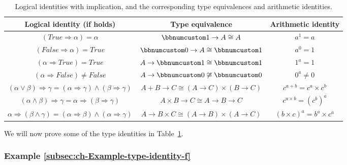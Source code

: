 \begin{table}
\begin{centering}
\begin{tabular}{|c|c|c|}
\hline 
\textbf{\small{}Logical identity (if holds)} & \textbf{\small{}Type equivalence} & \textbf{\small{}Arithmetic identity}\tabularnewline
\hline 
\hline 
{\small{}$\left(True\Rightarrow\alpha\right)=\alpha$} & {\small{}$\bbnum 1\rightarrow A\cong A$} & {\small{}$a^{1}=a$}\tabularnewline
\hline 
{\small{}$\left(False\Rightarrow\alpha\right)=True$} & {\small{}$\bbnum 0\rightarrow A\cong\bbnum 1$} & {\small{}$a^{0}=1$}\tabularnewline
\hline 
{\small{}$\left(\alpha\Rightarrow True\right)=True$} & {\small{}$A\rightarrow\bbnum 1\cong\bbnum 1$} & {\small{}$1^{a}=1$}\tabularnewline
\hline 
{\small{}$\left(\alpha\Rightarrow False\right)\neq False$} & {\small{}$A\rightarrow\bbnum 0\not\cong\bbnum 0$} & {\small{}$0^{a}\neq0$}\tabularnewline
\hline 
{\small{}$\left(\alpha\vee\beta\right)\Rightarrow\gamma=\left(\alpha\Rightarrow\gamma\right)\wedge\left(\beta\Rightarrow\gamma\right)$} & {\small{}$A+B\rightarrow C\cong\left(A\rightarrow C\right)\times\left(B\rightarrow C\right)$} & {\small{}$c^{a+b}=c^{a}\times c^{b}$}\tabularnewline
\hline 
{\small{}$(\alpha\wedge\beta)\Rightarrow\gamma=\alpha\Rightarrow\left(\beta\Rightarrow\gamma\right)$} & {\small{}$A\times B\rightarrow C\cong A\rightarrow B\rightarrow C$} & {\small{}$c^{a\times b}=(c^{b})^{a}$}\tabularnewline
\hline 
{\small{}$\alpha\Rightarrow\left(\beta\wedge\gamma\right)=\left(\alpha\Rightarrow\beta\right)\wedge\left(\alpha\Rightarrow\gamma\right)$} & {\small{}$A\rightarrow B\times C\cong\left(A\rightarrow B\right)\times\left(A\rightarrow C\right)$} & {\small{}$\left(b\times c\right)^{a}=b^{a}\times c^{a}$}\tabularnewline
\hline 
\end{tabular}
\par\end{centering}
\caption{Logical identities with implication, and the corresponding type equivalences
and arithmetic identities.\label{tab:Logical-identities-with-function-types}}
\end{table}

We will now prove some of the type identities in Table~\ref{tab:Logical-identities-with-function-types}.

\subsubsection{Example \label{subsec:ch-Example-type-identity-f}\ref{subsec:ch-Example-type-identity-f}}

